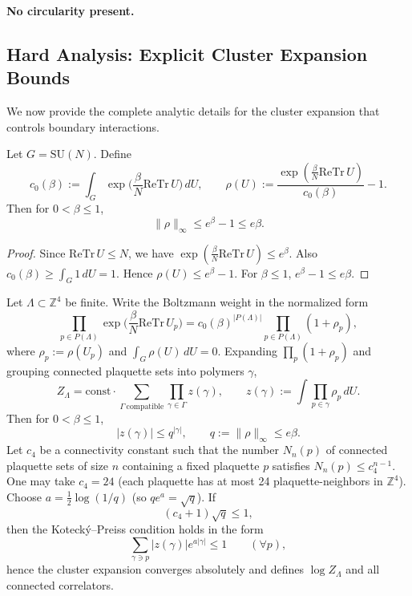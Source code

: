 \begin{theorem}
\begin{verification}
\textbf{No circularity present.}
\end{verification}

\subsection{Hard Analysis: Explicit Cluster Expansion Bounds}

We now provide the complete analytic details for the cluster expansion that controls boundary interactions.

\begin{proposition}
Let $G=\mathrm{SU}(N)$. Define
\[
c_0(\beta):=\int_G \exp\Big(\frac{\beta}{N}\mathrm{Re}\mathrm{Tr}\,U\Big)\,dU,\qquad
\rho(U):=\frac{\exp(\frac{\beta}{N}\mathrm{Re}\mathrm{Tr}\,U)}{c_0(\beta)}-1.
\]
Then for $0<\beta\le 1$,
\[
\|\rho\|_\infty \le e^\beta-1 \le e\beta.
\]
\end{proposition}

\begin{proof}
Since $\mathrm{Re}\mathrm{Tr}\,U\le N$, we have $\exp(\frac{\beta}{N}\mathrm{Re}\mathrm{Tr}\,U)\le e^\beta$. Also $c_0(\beta)\ge \int_G 1\,dU=1$. Hence $\rho(U)\le e^\beta-1$. For $\beta\le1$, $e^\beta-1\le e\beta$.
\end{proof}

\begin{theorem}
\label{thm:polymer-convergence}
Let $\Lambda\subset\mathbb Z^4$ be finite. Write the Boltzmann weight in the normalized form
\[
\prod_{p\in P(\Lambda)} \exp\Big(\frac{\beta}{N}\mathrm{Re}\mathrm{Tr}\,U_p\Big)
= c_0(\beta)^{|P(\Lambda)|}\prod_{p\in P(\Lambda)} (1+\rho_p),
\]
where $\rho_p:=\rho(U_p)$ and $\int_G \rho(U)\,dU=0$. Expanding $\prod_p(1+\rho_p)$ and grouping connected plaquette sets into polymers $\gamma$,
\[
Z_\Lambda = \text{const}\cdot \sum_{\Gamma\ \text{compatible}} \prod_{\gamma\in\Gamma} z(\gamma),
\qquad
z(\gamma):=\int \prod_{p\in\gamma}\rho_p\,dU.
\]
Then for $0<\beta\le1$,
\[
|z(\gamma)|\le q^{|\gamma|},\qquad q:=\|\rho\|_\infty\le e\beta.
\]
Let $c_4$ be a connectivity constant such that the number $N_n(p)$ of connected plaquette sets of size $n$ containing a fixed plaquette $p$ satisfies $N_n(p)\le c_4^{n-1}$. One may take $c_4=24$ (each plaquette has at most 24 plaquette-neighbors in $\mathbb Z^4$).
Choose $a=\frac12\log(1/q)$ (so $q e^a=\sqrt{q}$). If
\[
(c_4+1)\sqrt{q}\le 1,
\]
then the Kotecký–Preiss condition holds in the form
\[
\sum_{\gamma\ni p} |z(\gamma)|e^{a|\gamma|}\le 1\qquad(\forall p),
\]
hence the cluster expansion converges absolutely and defines $\log Z_\Lambda$ and all connected correlators.
\end{theorem}


\end{theorem}
